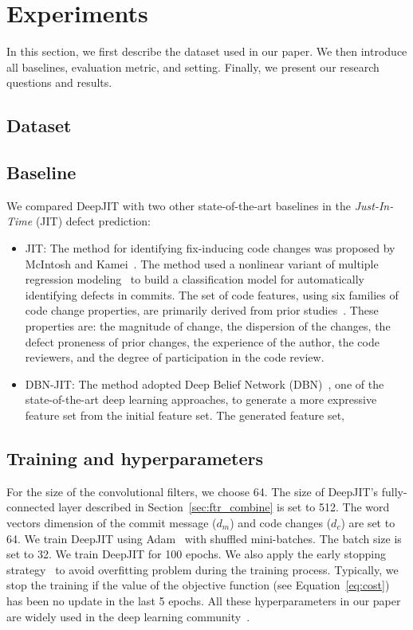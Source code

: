 \section{Experiments}
\label{sec:exp}
In this section, we first describe the dataset used in our paper. We then introduce all baselines, evaluation metric, and setting. Finally, we present our research questions and results.

\subsection{Dataset}
\label{sec:dataset}

\subsection{Baseline}
\label{sec:baseline}
We compared DeepJIT with two other state-of-the-art baselines in the \emph{Just-In-Time} (JIT) defect prediction:
\begin{itemize}
\item JIT: The method for identifying fix-inducing code changes was proposed by McIntosh and Kamei~\cite{mcintosh2018fix}. The method used a nonlinear variant of multiple regression modeling~\cite{fox1997applied} to build a classification model for automatically identifying defects in commits. The set of code features, using six families of code change properties, are primarily derived from prior studies~\cite{Kamei:2013:LES, Kim:2008:CSC, Kononenko:2015, Mockus2000}. These properties are: the magnitude of change, the dispersion of the changes, the defect proneness of prior changes, the experience of the author, the code reviewers, and the degree of participation in the code review. 
\item DBN-JIT: The method adopted Deep Belief Network (DBN)~\cite{hinton2006reducing}, one of the state-of-the-art deep learning approaches, to generate a more expressive feature set from the initial feature set. The generated feature set,  
\end{itemize}

\subsection{Training and hyperparameters}
\label{sec:training_parameters}
For the size of the convolutional filters, we choose 64. The size of DeepJIT's fully-connected layer described in Section~\ref{sec:ftr_combine} is set to 512. The word vectors dimension of the commit message ($d_m$) and code changes ($d_c$) are set to 64. We train DeepJIT using Adam~\cite{kingma2014adam} with shuffled mini-batches.  The batch size is set to 32. We train DeepJIT for 100 epochs. We also apply the early stopping strategy~\cite{prechelt1998automatic, caruana2001overfitting} to avoid overfitting problem during the training process. Typically, we stop the training if the value of the objective function (see Equation~\ref{eq:cost}) has been no update in the last 5 epochs. All these hyperparameters in our paper are widely used in the deep learning community~\cite{severyn2015learning, huo2016learning, huo2017enhancing, hinton2012improving}. 
 

